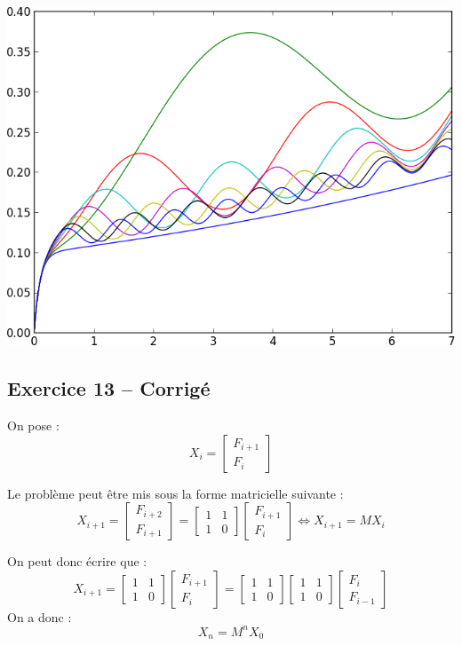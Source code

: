 \documentclass[10pt,fleqn]{article} %
\begin{document}
\begin{center}
\includegraphics[width=.4\linewidth]{images/exo_FB_12}
\end{center}


{}
\subsection*{Exercice 13 -- Corrigé}

\begin{corrige}
On pose : 
$$
X_i =\begin{bmatrix}
F_{i+1} \\
F_{i}
\end{bmatrix} 
$$

Le problème peut être mis sous la forme matricielle suivante : 
$$
X_{i+1} =
\begin{bmatrix}
F_{i+2} \\
F_{i+1}
\end{bmatrix} 
=
\begin{bmatrix}
1 & 1  \\
1 & 0 
\end{bmatrix} 
\begin{bmatrix}
F_{i+1} \\
F_{i}
\end{bmatrix} 
\Leftrightarrow X_{i+1} = M X_{i}
$$

On  peut donc écrire que  :
$$
X_{i+1} =
\begin{bmatrix}
1 & 1  \\
1 & 0 
\end{bmatrix} 
\begin{bmatrix}
F_{i+1} \\
F_{i}
\end{bmatrix} 
=
\begin{bmatrix}
1 & 1  \\
1 & 0 
\end{bmatrix} 
\begin{bmatrix}
1 & 1  \\
1 & 0 
\end{bmatrix} 
\begin{bmatrix}
F_{i} \\
F_{i-1}
\end{bmatrix} 
$$
 On a donc :
 $$
X_{n} = M^n X_{0}
$$

\end{corrige}
\end{document}

